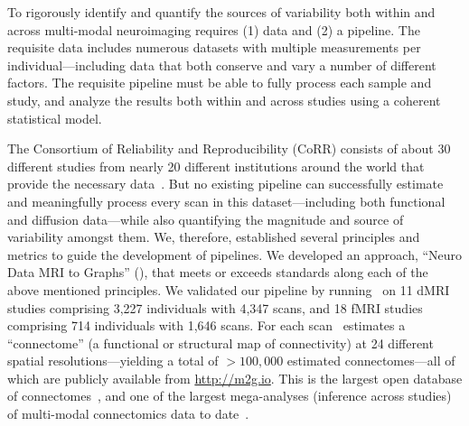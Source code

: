 \documentclass[11pt]{article}
\begin{document}
To rigorously identify and quantify the sources of variability both within and across  multi-modal neuroimaging  requires (1) data and (2) a pipeline. The requisite data includes  numerous datasets with multiple measurements per individual---including data that both conserve and vary a number of different factors. The requisite pipeline must be able to fully  process each sample and study, and analyze the results both within and across studies using a coherent statistical model.  


The Consortium of Reliability and Reproducibility (CoRR) consists of about 30 different studies from nearly 20 different institutions around the world that provide the necessary data~\cite{corr}. But no existing pipeline can successfully estimate and meaningfully process every scan in this dataset---including both functional and diffusion data---while also quantifying the magnitude and source of variability amongst them. 
We, therefore, established several principles and metrics to guide the development of pipelines.  
We developed an approach, ``Neuro Data MRI to Graphs'' (\ndmg), that 
meets or exceeds standards along each of the above mentioned principles. We validated our pipeline by running \ndmg~on 11 dMRI  studies comprising 3,227 individuals with 4,347 scans, 
and 18 fMRI  studies comprising 714 individuals with 1,646 scans. 
For each scan \ndmg~estimates  a ``connectome'' (a functional or structural map of connectivity) at 24 different spatial resolutions---yielding a total of  $>100,000$ estimated connectomes---all of which are publicly available from \url{http://m2g.io}. This is the largest open database of connectomes~\cite{brown2016connected},
and one of the largest mega-analyses (inference across studies) of multi-modal connectomics data to date~\cite{varoquaux2013learning, vidaurre2017discovering}. 
\end{document}
